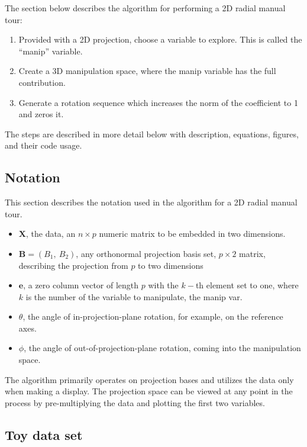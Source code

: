 The section below describes the algorithm for performing a 2D radial
manual tour:

\begin{enumerate}
\def\labelenumi{\arabic{enumi}.}
\tightlist
\item
  Provided with a 2D projection, choose a variable to explore. This is
  called the ``manip'' variable.
\item
  Create a 3D manipulation space, where the manip variable has the full
  contribution.
\item
  Generate a rotation sequence which increases the norm of the
  coefficient to 1 and zeros it.
\end{enumerate}

The steps are described in more detail below with description,
equations, figures, and their code usage.

\hypertarget{notation}{%
\subsection{Notation}\label{notation}}

This section describes the notation used in the algorithm for a 2D
radial manual tour.

\begin{itemize}
  \item $\textbf{X}$, the data, an $n \times p$ numeric matrix to be embedded in two dimensions.
  \item $\textbf{B} = (B_1,~ B_2)$, any orthonormal projection basis set, $p \times 2$ matrix, describing the projection from $p$ to two dimensions
  \item $\textbf{e}$, a zero column vector of length $p$ with the $k-$th element set to one, where $k$ is the number of the variable to manipulate, the manip var.
  \item $\theta$, the angle of in-projection-plane rotation, for example, on the reference axes.
  \item $\phi$, the angle of out-of-projection-plane rotation, coming into the manipulation space.
\end{itemize}

The algorithm primarily operates on projection bases and utilizes the
data only when making a display. The projection space can be viewed at
any point in the process by pre-multiplying the data and plotting the
first two variables.

\hypertarget{toy-data-set}{%
\subsection{Toy data set}\label{toy-data-set}}


